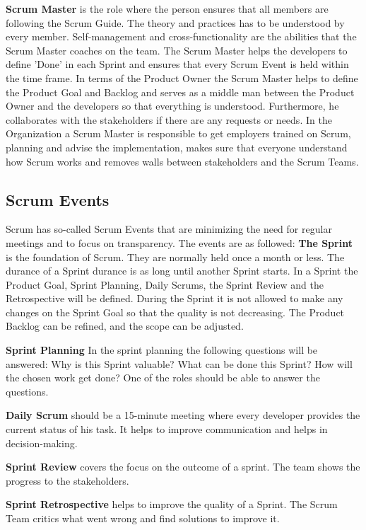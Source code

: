 \textbf{Scrum Master} is the role where the person ensures that all members are following the Scrum Guide. The theory and practices has to be understood by every member. Self-management and cross-functionality are the abilities that the Scrum Master coaches on the team. The Scrum Master helps the developers to define 'Done' in each Sprint and ensures that every Scrum Event is held within the time frame. In terms of the Product Owner the Scrum Master helps to define the Product Goal and Backlog and serves as a middle man between the Product Owner and the developers so that everything is understood. Furthermore, he collaborates with the stakeholders if there are any requests or needs. In the Organization a Scrum Master is responsible to get employers trained on Scrum, planning and advise the implementation, makes sure that everyone understand how Scrum works and removes walls between stakeholders and the Scrum Teams. \cite{scrum_guide}

\subsection{Scrum Events} \label{sec:Scrum Events}
Scrum has so-called Scrum Events that are minimizing the need for regular meetings and to focus on transparency. The events are as followed:
\textbf{The Sprint} is the foundation of Scrum. They are normally held once a month or less. The durance of a Sprint durance is as long until another Sprint starts. In a Sprint the Product Goal, Sprint Planning, Daily Scrums, the Sprint Review and the Retrospective will be defined. During the Sprint it is not allowed to make any changes on the Sprint Goal so that the quality is not decreasing. The Product Backlog can be refined, and the scope can be adjusted. \cite{scrum_guide}

\textbf{Sprint Planning} In the sprint planning the following questions will be answered: Why is this Sprint valuable? What can be done this Sprint? How will the chosen work get done? One of the roles should be able to answer the questions. \cite{scrum_guide}

\textbf{Daily Scrum} should be a 15-minute meeting where every developer provides the current status of his task. It helps to improve communication and helps in decision-making. \cite{scrum_guide}

\textbf{Sprint Review} covers the focus on the outcome of a sprint. The team shows the progress to the stakeholders. \cite{scrum_guide}

\textbf{Sprint Retrospective} helps to improve the quality of a Sprint. The Scrum Team critics what went wrong and find solutions to improve it. \cite{scrum_guide}

